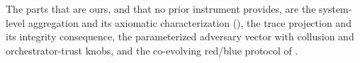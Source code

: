 The parts that are ours, and that no prior instrument provides, are the system-level
aggregation and its axiomatic characterization (), the trace projection and
its integrity consequence, the parameterized adversary vector with collusion and
orchestrator-trust knobs, and the co-evolving red/blue protocol of .
